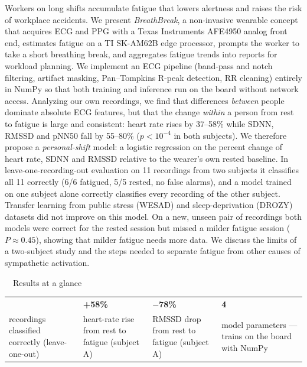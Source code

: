 \documentclass[11pt]{article}
\begin{document}
\vspace{10pt}
\begin{tcolorbox}[enhanced,colback=white,colframe=bbteal,boxrule=0.8pt,arc=3pt,left=10pt,right=10pt,
  title={\sffamily\bfseries Abstract},colbacktitle=bbteal,coltitle=white]
Workers on long shifts accumulate fatigue that lowers alertness and raises the risk of
workplace accidents. We present \emph{BreathBreak}, a non-invasive wearable concept that
acquires ECG and PPG with a Texas Instruments AFE4950 analog front end, estimates fatigue on a
TI SK-AM62B edge processor, prompts the worker to take a short breathing break, and aggregates
fatigue trends into reports for workload planning. We implement an ECG pipeline (band-pass and notch filtering, artifact masking,
Pan--Tompkins R-peak detection, RR cleaning) entirely in NumPy so that both training and inference
run on the board without network access. Analyzing our own recordings, we find that differences
\emph{between} people dominate absolute ECG features, but that the change \emph{within} a person
from rest to fatigue is large and consistent: heart rate rises by 37--58\% while SDNN, RMSSD and
pNN50 fall by 55--80\% ($p<10^{-4}$ in both subjects). We therefore propose a
\emph{personal-shift} model: a logistic regression on the percent change of heart rate, SDNN and
RMSSD relative to the wearer's own rested baseline. In leave-one-recording-out evaluation on 11
recordings from two subjects it classifies all 11 correctly (6/6 fatigued, 5/5 rested, no false
alarms), and a model trained on one subject alone correctly classifies every recording of the
other subject. Transfer learning from public stress (WESAD) and sleep-deprivation (DROZY) datasets did not improve on this model. On a new, unseen pair of recordings both models were correct for the rested session but missed a milder fatigue session ($P\approx0.45$), showing that milder fatigue needs more data. We discuss the limits of a two-subject study and the steps needed to separate
fatigue from other causes of sympathetic activation.
\end{tcolorbox}

\begin{keybox}{\faChartLine\ \ Results at a glance}
\begin{tabularx}{\linewidth}{@{}>{\centering\arraybackslash}X >{\centering\arraybackslash}X >{\centering\arraybackslash}X >{\centering\arraybackslash}X@{}}
{\sffamily\bfseries\huge\color{bbteal}11/11} & {\sffamily\bfseries\huge\color{bbcoral}+58\%} & {\sffamily\bfseries\huge\color{bbnavy}$-$78\%} & {\sffamily\bfseries\huge\color{bbteal}4} \\
\small recordings classified correctly (leave-one-out) & \small heart-rate rise from rest to fatigue (subject A) & \small RMSSD drop from rest to fatigue (subject A) & \small model parameters --- trains on the board with NumPy \\
\end{tabularx}
\end{keybox}
\end{document}
